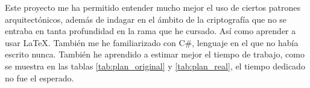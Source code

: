 Este proyecto me ha permitido entender mucho mejor el uso de ciertos patrones arquitectónicos, además de indagar en el ámbito de la criptografía que no se entraba en tanta profundidad en la rama que he cursado. Así como aprender a usar LaTeX. También me he familiarizado con C\#, lenguaje en el que no había escrito nunca. También he aprendido a estimar mejor el tiempo de trabajo, como se muestra en las tablas \ref{tab:plan_original} y \ref{tab:plan_real}, el tiempo dedicado no fue el esperado.